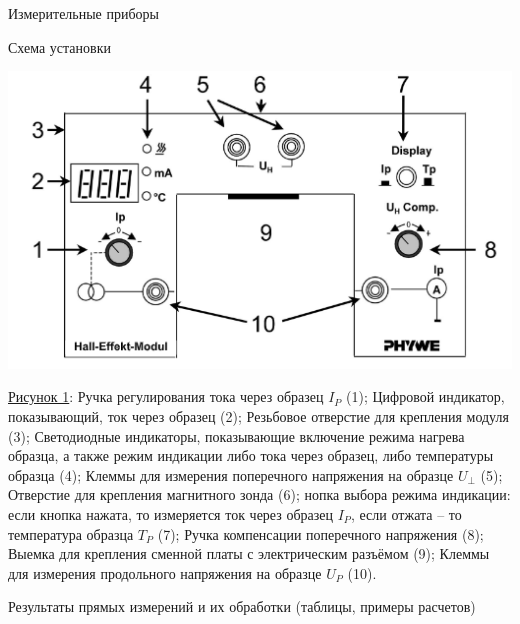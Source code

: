 \documentclass[12pt]{article}
\begin{document}
    \begin{point}{Измерительные приборы}
        \devices
    \end{point}

    \begin{point}{Схема установки}
        \par
        \includegraphics[width=\textwidth]{images/scheme.png}
        \begin{center}
        \underline{Рисунок 1}: Ручка регулирования тока через образец $I_{P}$ (1);
            Цифровой индикатор, показывающий, ток через образец (2);
            Резьбовое отверстие для крепления модуля (3);
           Светодиодные индикаторы, показывающие включение режима
нагрева образца, а также режим индикации либо тока через образец, либо температуры образца (4);
           Клеммы для измерения поперечного напряжения на образце $U_{\perp}$ (5);
          Отверстие для крепления магнитного зонда  (6);
           нопка выбора режима индикации: если кнопка нажата, то измеряется ток через образец $I_{P}$, если отжата – то температура образца $T_{P}$ (7);
          Ручка компенсации поперечного напряжения (8);
          Выемка для крепления сменной платы с электрическим разъёмом  (9);
         Клеммы для измерения продольного напряжения на образце $U_{P}$ (10).
        \end{center}
    \end{point}

    \begin{point}{Результаты прямых измерений и их обработки (таблицы, примеры расчетов)}
        \izmerenia
    \end{point}
\end{document}
